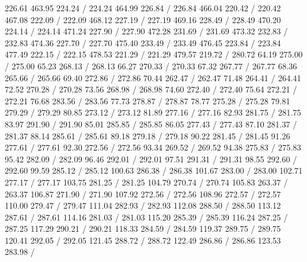 { 226.61 463.95 224.24 /
 224.24 464.99 226.84 /
 226.84 466.04 220.42 /
 220.42 467.08 222.09 /
 222.09 468.12 227.19 /
 227.19 469.16 228.49 /
 228.49 470.20 224.14 /
 224.14 471.24 227.90 /
 227.90 472.28 231.69 /
 231.69 473.32 232.83 /
 232.83 474.36 227.70 /
 227.70 475.40 233.49 /
 233.49 476.45 223.84 /
 223.84 477.49 222.15 /
 222.15 478.53 221.29 /
 221.29 479.57 219.72 /
\setsolid
{} 280.72 64.19 275.00 /
 275.00 65.23 268.13 /
 268.13 66.27 270.33 /
 270.33 67.32 267.77 /
 267.77 68.36 265.66 /
 265.66 69.40 272.86 /
 272.86 70.44 262.47 /
 262.47 71.48 264.41 /
 264.41 72.52 270.28 /
 270.28 73.56 268.98 /
 268.98 74.60 272.40 /
 272.40 75.64 272.21 /
 272.21 76.68 283.56 /
 283.56 77.73 278.87 /
 278.87 78.77 275.28 /
 275.28 79.81 279.29 /
 279.29 80.85 273.12 /
 273.12 81.89 277.16 /
 277.16 82.93 281.75 /
 281.75 83.97 291.90 /
 291.90 85.01 285.85 /
 285.85 86.05 277.43 /
 277.43 87.10 281.37 /
 281.37 88.14 285.61 /
 285.61 89.18 279.18 /
 279.18 90.22 281.45 /
 281.45 91.26 277.61 /
 277.61 92.30 272.56 /
 272.56 93.34 269.52 /
 269.52 94.38 275.83 /
 275.83 95.42 282.09 /
 282.09 96.46 292.01 /
 292.01 97.51 291.31 /
 291.31 98.55 292.60 /
 292.60 99.59 285.12 /
 285.12 100.63 286.38 /
 286.38 101.67 283.00 /
 283.00 102.71 277.17 /
 277.17 103.75 281.25 /
 281.25 104.79 270.74 /
 270.74 105.83 263.37 /
 263.37 106.87 271.90 /
 271.90 107.92 272.56 /
 272.56 108.96 272.57 /
 272.57 110.00 279.47 /
 279.47 111.04 282.93 /
 282.93 112.08 288.50 /
 288.50 113.12 287.61 /
 287.61 114.16 281.03 /
 281.03 115.20 285.39 /
 285.39 116.24 287.25 /
 287.25 117.29 290.21 /
 290.21 118.33 284.59 /
 284.59 119.37 289.75 /
 289.75 120.41 292.05 /
 292.05 121.45 288.72 /
 288.72 122.49 286.86 /
 286.86 123.53 283.98 /
}
